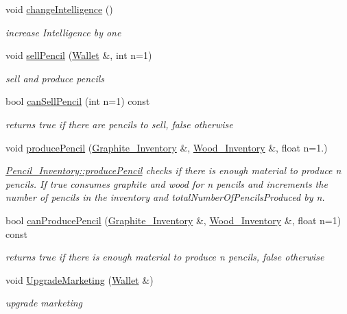 \begin{DoxyCompactItemize}
void \mbox{\hyperlink{classPencil__Inventory_ad636ed1ffea98dbf19169ebff6e765c6}{change\+Intelligence}} ()
\begin{DoxyCompactList}\small\item\em increase Intelligence by one \end{DoxyCompactList}\item 
void \mbox{\hyperlink{classPencil__Inventory_a1ed4fd3f13785ba2a93c9f4045a5cbc7}{sell\+Pencil}} (\mbox{\hyperlink{classWallet}{Wallet}} \&, int n=1)
\begin{DoxyCompactList}\small\item\em sell and produce pencils \end{DoxyCompactList}\item 
bool \mbox{\hyperlink{classPencil__Inventory_ab8c12609e21dfd98269e6d4589b13a1c}{can\+Sell\+Pencil}} (int n=1) const
\begin{DoxyCompactList}\small\item\em returns true if there are pencils to sell, false otherwise \end{DoxyCompactList}\item 
void \mbox{\hyperlink{classPencil__Inventory_a978a27186e1ae5e533479db824887f6d}{produce\+Pencil}} (\mbox{\hyperlink{classGraphite__Inventory}{Graphite\+\_\+\+Inventory}} \&, \mbox{\hyperlink{classWood__Inventory}{Wood\+\_\+\+Inventory}} \&, float n=1.)
\begin{DoxyCompactList}\small\item\em \mbox{\hyperlink{classPencil__Inventory_a978a27186e1ae5e533479db824887f6d}{Pencil\+\_\+\+Inventory\+::produce\+Pencil}} checks if there is enough material to produce n pencils. If true consumes graphite and wood for n pencils and increments the number of pencils in the inventory and total\+Number\+Of\+Pencils\+Produced by n. \end{DoxyCompactList}\item 
bool \mbox{\hyperlink{classPencil__Inventory_a15f66581a83070557a53b94227e3d722}{can\+Produce\+Pencil}} (\mbox{\hyperlink{classGraphite__Inventory}{Graphite\+\_\+\+Inventory}} \&, \mbox{\hyperlink{classWood__Inventory}{Wood\+\_\+\+Inventory}} \&, float n=1) const
\begin{DoxyCompactList}\small\item\em returns true if there is enough material to produce n pencils, false otherwise \end{DoxyCompactList}\item 
void \mbox{\hyperlink{classPencil__Inventory_a1c9d8d2f9859ddeb6397379efcf8941e}{Upgrade\+Marketing}} (\mbox{\hyperlink{classWallet}{Wallet}} \&)
\begin{DoxyCompactList}\small\item\em upgrade marketing \end{DoxyCompactList}\end{DoxyCompactItemize}
